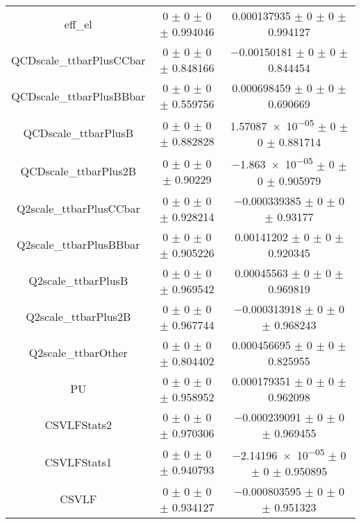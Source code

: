 \begin{table}
\begin{tabular}{ccc}
eff\_el & \num{0} $\pm$ \num{0} $\pm$ \num{0} $\pm$ \num{0.994046} & \num{0.000137935} $\pm$ \num{0} $\pm$ \num{0} $\pm$ \num{0.994127}\\
QCDscale\_ttbarPlusCCbar & \num{0} $\pm$ \num{0} $\pm$ \num{0} $\pm$ \num{0.848166} & \num{-0.00150181} $\pm$ \num{0} $\pm$ \num{0} $\pm$ \num{0.844454}\\
QCDscale\_ttbarPlusBBbar & \num{0} $\pm$ \num{0} $\pm$ \num{0} $\pm$ \num{0.559756} & \num{0.000698459} $\pm$ \num{0} $\pm$ \num{0} $\pm$ \num{0.690669}\\
QCDscale\_ttbarPlusB & \num{0} $\pm$ \num{0} $\pm$ \num{0} $\pm$ \num{0.882828} & \num{1.57087e-05} $\pm$ \num{0} $\pm$ \num{0} $\pm$ \num{0.881714}\\
QCDscale\_ttbarPlus2B & \num{0} $\pm$ \num{0} $\pm$ \num{0} $\pm$ \num{0.90229} & \num{-1.863e-05} $\pm$ \num{0} $\pm$ \num{0} $\pm$ \num{0.905979}\\
Q2scale\_ttbarPlusCCbar & \num{0} $\pm$ \num{0} $\pm$ \num{0} $\pm$ \num{0.928214} & \num{-0.000339385} $\pm$ \num{0} $\pm$ \num{0} $\pm$ \num{0.93177}\\
Q2scale\_ttbarPlusBBbar & \num{0} $\pm$ \num{0} $\pm$ \num{0} $\pm$ \num{0.905226} & \num{0.00141202} $\pm$ \num{0} $\pm$ \num{0} $\pm$ \num{0.920345}\\
Q2scale\_ttbarPlusB & \num{0} $\pm$ \num{0} $\pm$ \num{0} $\pm$ \num{0.969542} & \num{0.00045563} $\pm$ \num{0} $\pm$ \num{0} $\pm$ \num{0.969819}\\
Q2scale\_ttbarPlus2B & \num{0} $\pm$ \num{0} $\pm$ \num{0} $\pm$ \num{0.967744} & \num{-0.000313918} $\pm$ \num{0} $\pm$ \num{0} $\pm$ \num{0.968243}\\
Q2scale\_ttbarOther & \num{0} $\pm$ \num{0} $\pm$ \num{0} $\pm$ \num{0.804402} & \num{0.000456695} $\pm$ \num{0} $\pm$ \num{0} $\pm$ \num{0.825955}\\
PU & \num{0} $\pm$ \num{0} $\pm$ \num{0} $\pm$ \num{0.958952} & \num{0.000179351} $\pm$ \num{0} $\pm$ \num{0} $\pm$ \num{0.962098}\\
CSVLFStats2 & \num{0} $\pm$ \num{0} $\pm$ \num{0} $\pm$ \num{0.970306} & \num{-0.000239091} $\pm$ \num{0} $\pm$ \num{0} $\pm$ \num{0.969455}\\
CSVLFStats1 & \num{0} $\pm$ \num{0} $\pm$ \num{0} $\pm$ \num{0.940793} & \num{-2.14196e-05} $\pm$ \num{0} $\pm$ \num{0} $\pm$ \num{0.950895}\\
CSVLF & \num{0} $\pm$ \num{0} $\pm$ \num{0} $\pm$ \num{0.934127} & \num{-0.000803595} $\pm$ \num{0} $\pm$ \num{0} $\pm$ \num{0.951323}\\

\end{tabular}
\end{table}

